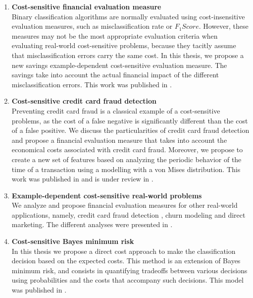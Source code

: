 \begin{enumerate}

\item \textbf{Cost-sensitive financial evaluation measure} \\
  Binary classification algorithms are normally evaluated using cost-insensitive 
  evaluation measures, such as misclassification rate or \mbox{$F_1Score$}. However, these 
  measures may not be the most appropriate evaluation criteria when  evaluating  
  real-world cost-sensitive problems, because they tacitly assume that 
  misclassification errors carry the same cost. In this thesis, we propose a new   savings 
  example-dependent cost-sensitive evaluation measure. The savings take into   account the actual 
  financial impact of the different misclassification errors. This work was published in 
  \citep{CorreaBahnsen2013}.
  
\item \textbf{Cost-sensitive credit card fraud detection} \\
  Preventing credit card fraud is a classical example of a cost-sensitive problems, as 
  the cost of a false negative is significantly different than the cost of a false positive. We 
  discuss the particularities of credit card   fraud detection and propose a financial evaluation 
  measure that takes into account the   economical costs associated with credit card fraud. 
  Moreover, we propose to create a new set of features based on analyzing the periodic behavior of 
  the time of a transaction using a modelling with a von Mises distribution.  This work was published in 
\citep{CorreaBahnsen2013,CorreaBahnsen2014} and is under review in
\cite{CorreaBahnsen2015c,CorreaBahnsen2015d}.
  
\item \textbf{Example-dependent cost-sensitive real-world problems} \\
  We analyze and propose financial evaluation measures for other real-world applications, 
  namely, credit card fraud detection , churn modeling and direct marketing.
  The different analyses were presented in 
\citep{CorreaBahnsen2014,CorreaBahnsen2014b,CorreaBahnsen2015a}.

\item \textbf{Cost-sensitive Bayes minimum risk} \\
  In this thesis we propose a direct cost approach to make the classification decision based on 
  the expected costs.   This method is an extension of Bayes minimum risk, and consists in quantifying 
  tradeoffs between various   decisions using   probabilities and the costs that accompany such 
  decisions. This model was published in \citep{CorreaBahnsen2013,CorreaBahnsen2014}.
  

\end{enumerate}
